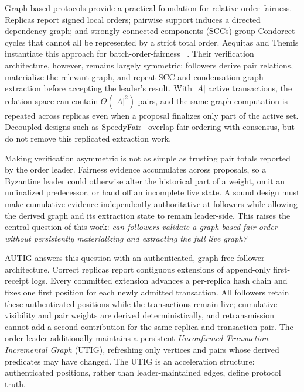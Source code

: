 Graph-based protocols provide a practical foundation for relative-order
fairness. Replicas report signed local orders; pairwise support induces a
directed dependency graph; and strongly connected components (SCCs) group
Condorcet cycles that cannot all be represented by a strict total order.
Aequitas and Themis instantiate this approach for batch-order-fairness
~\cite{kelkar2020order,kelkar2023themis}. Their verification architecture,
however, remains largely symmetric: followers derive pair relations,
materialize the relevant graph, and repeat SCC and condensation-graph
extraction before accepting the leader's result. With $|A|$ active
transactions, the relation space can contain $\Theta(|A|^2)$ pairs, and the
same graph computation is repeated across replicas even when a proposal
finalizes only part of the active set. Decoupled designs such as
SpeedyFair~\cite{mu2024separation} overlap fair ordering with consensus, but
do not remove this replicated extraction work.

Making verification asymmetric is not as simple as trusting pair totals
reported by the order leader. Fairness evidence accumulates across proposals,
so a Byzantine leader could otherwise alter the historical part of a weight,
omit an unfinalized predecessor, or hand off an incomplete live state. A sound
design must make cumulative evidence independently authoritative at followers
while allowing the derived graph and its extraction state to remain
leader-side. This raises the central question of this work: \emph{can
followers validate a graph-based fair order without persistently
materializing and extracting the full live graph?}

AUTIG answers this question with an authenticated, graph-free follower
architecture. Correct replicas report contiguous extensions of append-only
first-receipt logs. Every committed extension advances a per-replica hash
chain and fixes one first position for each newly admitted transaction. All
followers retain these authenticated positions while the transactions remain
live; cumulative visibility and pair weights are derived deterministically,
and retransmission
cannot add a second contribution for the same replica and transaction pair.
The order leader additionally maintains a persistent
\emph{Unconfirmed-Transaction Incremental Graph} (UTIG), refreshing only
vertices and pairs whose derived predicates may have changed. The UTIG is an
acceleration structure: authenticated positions, rather than
leader-maintained edges, define protocol truth.

